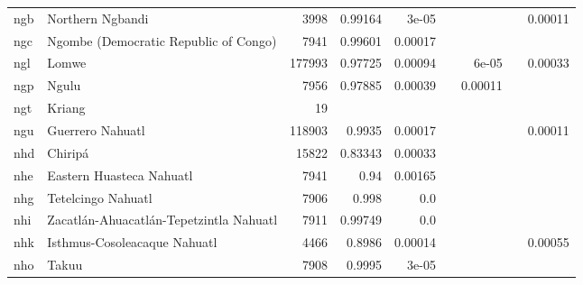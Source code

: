 \documentclass[11pt]{article}
\begin{document}
\begin{table*}[h]
{\begin{tabular}{llrrrrrrr}
ngb         & Northern Ngbandi         & 3998         & 0.99164         & 3e-05         &          &          &          & 0.00011         \\

ngc         & Ngombe (Democratic Republic of Congo)         & 7941         & 0.99601         & 0.00017         &          &          &          &          \\

ngl         & Lomwe         & 177993         & 0.97725         & 0.00094         &          & 6e-05         &          & 0.00033         \\

ngp         & Ngulu         & 7956         & 0.97885         & 0.00039         &          & 0.00011         &          &          \\

ngt         & Kriang         & 19         &          &          &          &          &          &          \\

ngu         & Guerrero Nahuatl         & 118903         & 0.9935         & 0.00017         &          &          &          & 0.00011         \\

nhd         & Chiripá         & 15822         & 0.83343         & 0.00033         &          &          &          &          \\

nhe         & Eastern Huasteca Nahuatl         & 7941         & 0.94         & 0.00165         &          &          &          &          \\

nhg         & Tetelcingo Nahuatl         & 7906         & 0.998         & 0.0         &          &          &          &          \\

nhi         & Zacatlán-Ahuacatlán-Tepetzintla Nahuatl         & 7911         & 0.99749         & 0.0         &          &          &          &          \\

nhk         & Isthmus-Cosoleacaque Nahuatl         & 4466         & 0.8986         & 0.00014         &          &          &          & 0.00055         \\

nho         & Takuu         & 7908         & 0.9995         & 3e-05         &          &          &          &          \\


\end{tabular}}
\end{table*}
\end{document}
